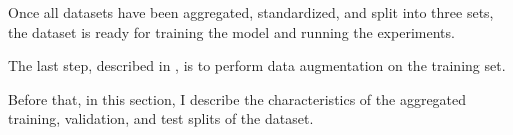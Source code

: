 
Once all datasets have been aggregated, standardized, and
split into three sets, the dataset is ready for training the
model and running the experiments.

The last step, described in , is to
perform data augmentation on the training set.

Before that, in this section, I describe the characteristics
of the aggregated training, validation, and test splits of
the dataset.